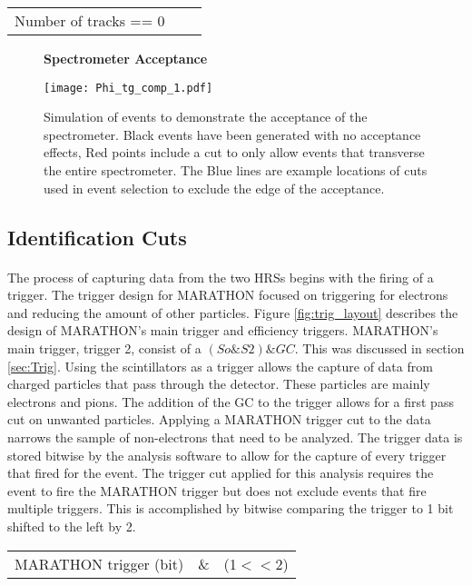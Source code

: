 \begin{tabular}{@{$\bullet$ }lll}
	Number of tracks == 0
\end{tabular}

\begin{figure}[]
	\centering
	\textbf{Spectrometer Acceptance}\par\medskip
	\vspace*{-5pt}
	\texttt{[image: Phi\_tg\_comp\_1.pdf]}
	\caption{Simulation of events to demonstrate the acceptance of the spectrometer. Black events have been generated with no acceptance effects, Red points include a cut to only allow events that transverse the entire spectrometer. The Blue lines are example locations of cuts used in event selection to exclude the edge of the acceptance. }
	\label{phi_comp}
\end{figure}


\subsection{Identification Cuts}
\paragraph{} The process of capturing data from the two HRSs begins with the firing of a trigger. The trigger design for MARATHON focused on triggering for electrons and reducing the amount of other particles. Figure \ref{fig:trig_layout} describes the design of MARATHON's main trigger and efficiency triggers. MARATHON's main trigger, trigger 2, consist of a $(So \& S2) \& GC$. This was discussed in section \ref{sec:Trig}. Using the scintillators as a trigger allows the capture of data from charged particles that pass through the detector. These particles are mainly electrons and pions. The addition of the GC to the trigger allows for a first pass cut on unwanted particles. Applying a MARATHON trigger cut to the data narrows the sample of non-electrons that need to be analyzed. The trigger data is stored bitwise by the analysis software to allow for the capture of every trigger that fired for the event. The trigger cut applied for this analysis requires the event to fire the MARATHON trigger but does not exclude events that fire multiple triggers. This is accomplished by bitwise comparing the trigger to 1 bit shifted to the left by 2.  
   
\begin{tabular}{@{$\bullet$ }lll}
	MARATHON trigger (bit) &\& &(1$<<$2)
\end{tabular}

